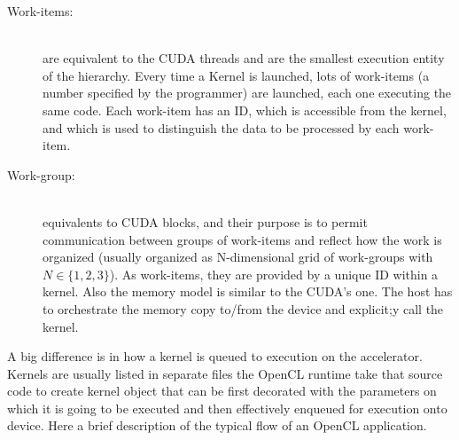 \begin{description}
  \item [Work-items:] \hfill\\ are equivalent to the CUDA threads and are the smallest execution
entity of the hierarchy. Every time a Kernel is launched, lots of work-items (a
number specified by the programmer) are launched, each one executing the same
code. Each work-item has an ID,  which is accessible from the kernel, and which
is used to distinguish the data to be processed by each work-item.
  \item [Work-group:] \hfill\\  equivalents to CUDA blocks, and their purpose is
  to permit communication between groups of work-items and reflect how the work
  is organized (usually organized as N-dimensional grid of work-groups with
  \begin{math}N \in\{1,2,3\}\end{math}).
  As work-items, they are provided by a unique ID within a kernel.
  Also the memory model is similar to the CUDA's one.
  The host has to orchestrate the memory copy to/from the device and explicit;y
  call the kernel.
\end{description}
  A big difference is in how a kernel is queued to execution on the
  accelerator. Kernels are usually listed in separate
  files the OpenCL runtime take that source code to create kernel object that
  can be first decorated with the parameters on which it is going to
  be executed and then effectively enqueued for execution onto device.
  Here a brief description of the typical flow of an OpenCL application.
  
